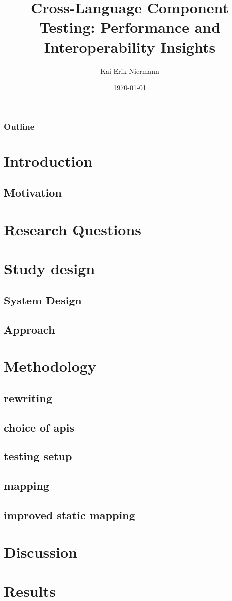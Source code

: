 \documentclass{beamer}
\title{Cross-Language Component Testing: Performance and Interoperability Insights}
\author{Kai Erik Niermann}
\date{\today}
\begin{document}
\frame{\titlepage}

\begin{frame}
\frametitle{Outline}
\tableofcontents
\end{frame}

\section{Introduction}

\subsection{Motivation}
 

\section{Research Questions}


\section{Study design}
\subsection{System Design}

\subsection{Approach}


\section{Methodology}
\subsection{rewriting}

\subsection{choice of apis}

\subsection{testing setup}


\subsection{mapping}


\subsection{improved static mapping}



\section{Discussion}



\section{Results}



\end{document}
